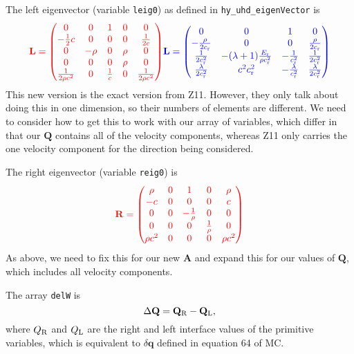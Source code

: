 \documentclass[preprint,11pt]{aastex}
\newcommand{\beq}{\begin{equation}}
\newcommand{\eeq}{\end{equation}}
\begin{document}
The left eigenvector (variable \verb!leig0!)  as defined in \verb!hy_uhd_eigenVector! is
\beq
{\color{red}
\mathbf{L} = 
\begin{pmatrix}
0 & 0 & 1 & 0 & 0 \\
-\frac{1}{2} c & 0 & 0 & 0 & \frac{1}{2 c} \\
0 & -\rho & 0 & \rho & 0 \\
0 & 0 & 0 & \rho & 0 \\
\frac{1}{2 \rho c^2} & 0 & \frac{1}{c} & 0 & \frac{1}{2 \rho c^2}
\end{pmatrix}
}
{\color{blue}
\mathbf{L} = 
\begin{pmatrix}
0 & 0 & 1 & 0 \\
-\frac{\rho}{2c_{\rm r}}  & 0 & 0 & \frac{\rho}{2 c_{\rm r}} \\
\frac{1}{2 c_{\rm r}^2}& -(\lambda + 1) \frac{E_{\rm r}}{\rho c_{\rm r}^2}& -\frac{1}{c_{\rm r}^2}&\frac{1}{2c_{\rm r}^2} \\
\frac{\lambda}{2 c_{\rm r}^2}& c^2 c_{\rm r}^2& -\frac{\lambda}{c_{\rm r}^2}&\frac{\lambda}{2 c_{\rm r}^2}
\end{pmatrix}
}
\eeq
{\color{blue} This new version is the exact version from Z11.  However, they only talk about doing this in one dimension, so their numbers of elements are different.  We need to consider how to get this to work with our array of variables, which differ in that our $\mathbf{Q}$ contains all of the velocity components, whereas Z11 only carries the one velocity component for the direction being considered.}

The right eigenvector (variable \verb!reig0!) is
\beq
{\color{red}
\mathbf{R} = 
\begin{pmatrix}
\rho & 0 & 1 & 0 & \rho \\
-c & 0 & 0 & 0 & c \\
0 & 0 & -\frac{1}{\rho} & 0 & 0 \\
0 & 0 & 0 & \frac{1}{\rho} & 0 \\
\rho c^2 & 0 & 0 & 0 & \rho c^2
\end{pmatrix}
}
\eeq
{\color{blue} As above, we need to fix this for our new $\mathbf{A}$ and  expand this for our values of $\mathbf{Q}$, which includes all velocity components}.

The array \verb!delW! is
\beq
\Delta \mathbf{Q} = \mathbf{Q}_{\rm R} - \mathbf{Q}_{\rm L},
\eeq
where $Q_{\rm R}$ and $Q_{\rm L}$ are the right and left interface values of the primitive variables, which is equivalent to $\delta \mathbf{q}$ defined in equation 64 of MC.
\end{document}
